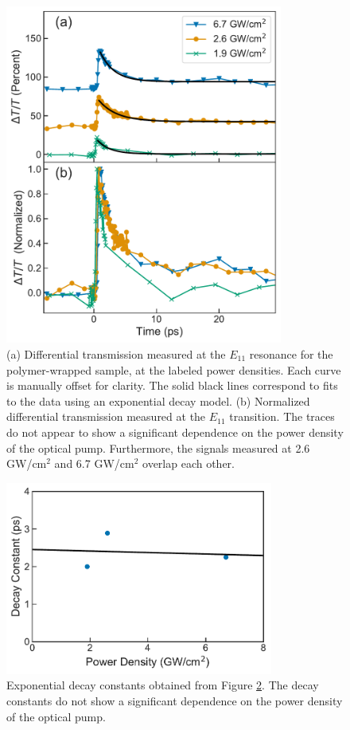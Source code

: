 \begin{figure}[ht]
	\centering
	\includegraphics[height=4.4in]{images/chapter_my_data/Jan_CNT_diff_trans_fits_and_normalized}
	\caption{(a) Differential transmission measured at the $E_{11}$ resonance for the polymer-wrapped sample, at the labeled power densities. Each curve is manually offset for clarity. The solid black lines correspond to fits to the data using an exponential decay model. (b) Normalized differential transmission measured at the $E_{11}$ transition. The traces do not appear to show a significant dependence on the power density of the optical pump. Furthermore, the signals measured at 2.6 GW/cm$^2$ and 6.7 GW/cm$^2$ overlap each other.}
	\label{fig:jan_cnt_max_normalized_dt}
\end{figure}

\clearpage

\begin{figure}[ht]
	\centering
	\includegraphics[height=2.5in]{images/chapter_my_data/Jan_CNT_decay_const_fit}
	\caption{Exponential decay constants obtained from Figure \ref{fig:jan_cnt_decay_const}. The decay constants do not show a significant dependence on the power density of the optical pump. }
	\label{fig:jan_cnt_decay_const}
\end{figure}

